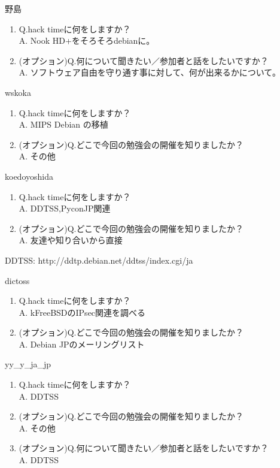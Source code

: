 \begin{prework}{ 野島 }
  \begin{enumerate}
  \item Q.hack timeに何をしますか？\\
    A. Nook HD+をそろそろdebianに。
  \item (オプション)Q.何について聞きたい／参加者と話をしたいですか？\\
    A. ソフトウェア自由を守り通す事に対して、何が出来るかについて。
  \end{enumerate}
\end{prework}

\begin{prework}{ wskoka }
  \begin{enumerate}
  \item Q.hack timeに何をしますか？\\
    A. MIPS Debian の移植
  \item (オプション)Q.どこで今回の勉強会の開催を知りましたか？\\
    A. その他
  \end{enumerate}
\end{prework}

\begin{prework}{ koedoyoshida  }
  \begin{enumerate}
  \item Q.hack timeに何をしますか？\\
    A. DDTSS,PyconJP関連
  \item (オプション)Q.どこで今回の勉強会の開催を知りましたか？\\
    A. 友達や知り合いから直接
  \end{enumerate}
  DDTSS: http://ddtp.debian.net/ddtss/index.cgi/ja
\end{prework}

\begin{prework}{ dictoss }
  \begin{enumerate}
  \item Q.hack timeに何をしますか？\\
    A. kFreeBSDのIPsec関連を調べる
  \item (オプション)Q.どこで今回の勉強会の開催を知りましたか？\\
    A. Debian JPのメーリングリスト
  \end{enumerate}
\end{prework}

\begin{prework}{ yy\_y\_ja\_jp }
  \begin{enumerate}
  \item Q.hack timeに何をしますか？\\
    A. DDTSS 
  \item (オプション)Q.どこで今回の勉強会の開催を知りましたか？\\
    A. その他
  \item (オプション)Q.何について聞きたい／参加者と話をしたいですか？\\
    A. DDTSS
  \end{enumerate}
\end{prework}

